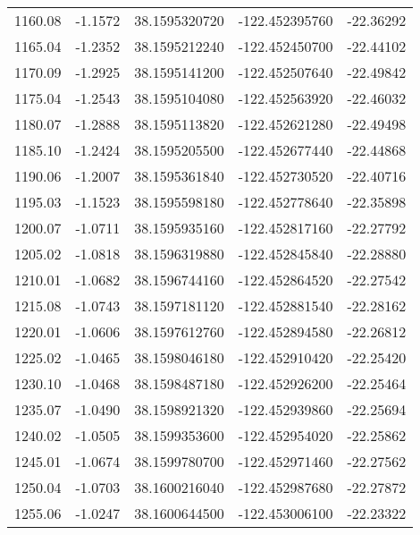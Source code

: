 \begin{longtable}{p{2.5cm}p{2.5cm}p{3cm}p{3cm}p{2.5cm}}
      1160.08  & 	-1.1572 &               38.1595320720  &   -122.452395760   &	-22.36292 \\
      1165.04  & 	-1.2352 &               38.1595212240  &   -122.452450700   &	-22.44102 \\
      1170.09  & 	-1.2925 &               38.1595141200  &   -122.452507640   &	-22.49842 \\
      1175.04  & 	-1.2543 &               38.1595104080  &   -122.452563920   &	-22.46032 \\
      1180.07  & 	-1.2888 &               38.1595113820  &   -122.452621280   &	-22.49498 \\
      1185.10  & 	-1.2424 &               38.1595205500  &   -122.452677440   &	-22.44868 \\
      1190.06  & 	-1.2007 &               38.1595361840  &   -122.452730520   &	-22.40716 \\
      1195.03  & 	-1.1523 &               38.1595598180  &   -122.452778640   &	-22.35898 \\
      1200.07  & 	-1.0711 &               38.1595935160  &   -122.452817160   &	-22.27792 \\
      1205.02  & 	-1.0818 &               38.1596319880  &   -122.452845840   &	-22.28880 \\
      1210.01  & 	-1.0682 &               38.1596744160  &   -122.452864520   &	-22.27542 \\
      1215.08  & 	-1.0743 &               38.1597181120  &   -122.452881540   &	-22.28162 \\
      1220.01  & 	-1.0606 &               38.1597612760  &   -122.452894580   &	-22.26812 \\
      1225.02  & 	-1.0465 &               38.1598046180  &   -122.452910420   &	-22.25420 \\
      1230.10  & 	-1.0468 &               38.1598487180  &   -122.452926200   &	-22.25464 \\
      1235.07  & 	-1.0490 &               38.1598921320  &   -122.452939860   &	-22.25694 \\
      1240.02  & 	-1.0505 &               38.1599353600  &   -122.452954020   &	-22.25862 \\
      1245.01  & 	-1.0674 &               38.1599780700  &   -122.452971460   &	-22.27562 \\
      1250.04  & 	-1.0703 &               38.1600216040  &   -122.452987680   &	-22.27872 \\
      1255.06  & 	-1.0247 &               38.1600644500  &   -122.453006100   &	-22.23322 \\

\end{longtable}
